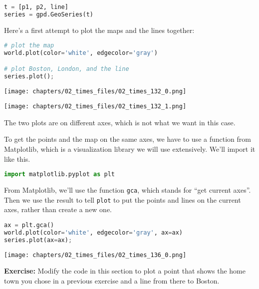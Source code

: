 \begin{lstlisting}[language=Python,style=source]
t = [p1, p2, line]
series = gpd.GeoSeries(t)
\end{lstlisting}

Here's a first attempt to plot the maps and the lines together:

\begin{lstlisting}[language=Python,style=source]
# plot the map
world.plot(color='white', edgecolor='gray')

# plot Boston, London, and the line
series.plot();
\end{lstlisting}

\begin{center}
\texttt{[image: chapters/02\_times\_files/02\_times\_132\_0.png]}
\end{center}

\begin{center}
\texttt{[image: chapters/02\_times\_files/02\_times\_132\_1.png]}
\end{center}

The two plots are on different axes, which is not what we want in this
case.

To get the points and the map on the same axes, we have to use a
function from Matplotlib, which is a visualization library we will use
extensively. We'll import it like this.

\begin{lstlisting}[language=Python,style=source]
import matplotlib.pyplot as plt
\end{lstlisting}

From Matplotlib, we'll use the function \passthrough{\lstinline!gca!},
which stands for ``get current axes''. Then we use the result to tell
\passthrough{\lstinline!plot!} to put the points and lines on the
current axes, rather than create a new one.

\begin{lstlisting}[language=Python,style=source]
ax = plt.gca()
world.plot(color='white', edgecolor='gray', ax=ax)
series.plot(ax=ax);
\end{lstlisting}

\begin{center}
\texttt{[image: chapters/02\_times\_files/02\_times\_136\_0.png]}
\end{center}

\textbf{Exercise:} Modify the code in this section to plot a point that
shows the home town you chose in a previous exercise and a line from
there to Boston.


